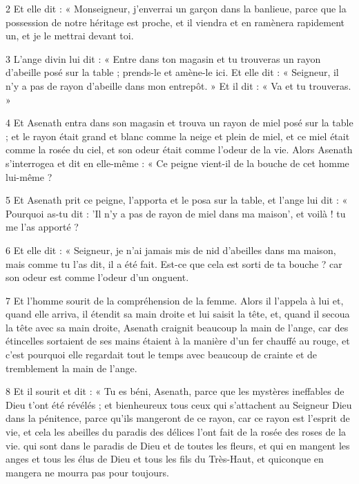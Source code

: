 \par 2 Et elle dit : « Monseigneur, j'enverrai un garçon dans la banlieue, parce que la possession de notre héritage est proche, et il viendra et en ramènera rapidement un, et je le mettrai devant toi.

\par 3 L'ange divin lui dit : « Entre dans ton magasin et tu trouveras un rayon d'abeille posé sur la table ; prends-le et amène-le ici. Et elle dit : « Seigneur, il n’y a pas de rayon d’abeille dans mon entrepôt. » Et il dit : « Va et tu trouveras. »

\par 4 Et Asenath entra dans son magasin et trouva un rayon de miel posé sur la table ; et le rayon était grand et blanc comme la neige et plein de miel, et ce miel était comme la rosée du ciel, et son odeur était comme l'odeur de la vie. Alors Asenath s'interrogea et dit en elle-même : « Ce peigne vient-il de la bouche de cet homme lui-même ?

\par 5 Et Asenath prit ce peigne, l'apporta et le posa sur la table, et l'ange lui dit : « Pourquoi as-tu dit : 'Il n'y a pas de rayon de miel dans ma maison', et voilà ! tu me l'as apporté ?

\par 6 Et elle dit : « Seigneur, je n'ai jamais mis de nid d'abeilles dans ma maison, mais comme tu l'as dit, il a été fait. Est-ce que cela est sorti de ta bouche ? car son odeur est comme l’odeur d’un onguent.

\par 7 Et l'homme sourit de la compréhension de la femme. Alors il l'appela à lui et, quand elle arriva, il étendit sa main droite et lui saisit la tête, et, quand il secoua la tête avec sa main droite, Asenath craignit beaucoup la main de l'ange, car des étincelles sortaient de ses mains étaient à la manière d'un fer chauffé au rouge, et c'est pourquoi elle regardait tout le temps avec beaucoup de crainte et de tremblement la main de l'ange.

\par 8 Et il sourit et dit : « Tu es béni, Asenath, parce que les mystères ineffables de Dieu t'ont été révélés ; et bienheureux tous ceux qui s'attachent au Seigneur Dieu dans la pénitence, parce qu'ils mangeront de ce rayon, car ce rayon est l'esprit de vie, et cela les abeilles du paradis des délices l'ont fait de la rosée des roses de la vie. qui sont dans le paradis de Dieu et de toutes les fleurs, et qui en mangent les anges et tous les élus de Dieu et tous les fils du Très-Haut, et quiconque en mangera ne mourra pas pour toujours.

